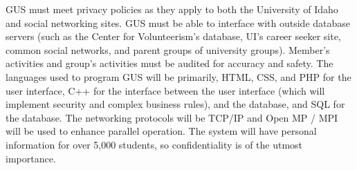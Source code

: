 		GUS must meet privacy policies as they apply to both the
		University of Idaho and social networking sites.  GUS must be
		able to interface with outside database servers (such as the
		Center for Volunteerism's database, UI's career seeker site,
		common social networks, and parent groups of university groups).
		Member's activities and group's activities must be audited for
		accuracy and safety.  The languages used to program GUS will be
		primarily, HTML, CSS, and PHP for the user interface, C++ for
		the interface between the user interface (which will implement
		security and complex business rules), and the database, and
		SQL for the database.  The networking protocols will be TCP/IP
		and Open MP / MPI will be used to enhance parallel operation.
		The system will have personal information for over 5,000
		students, so confidentiality is of the utmost importance.